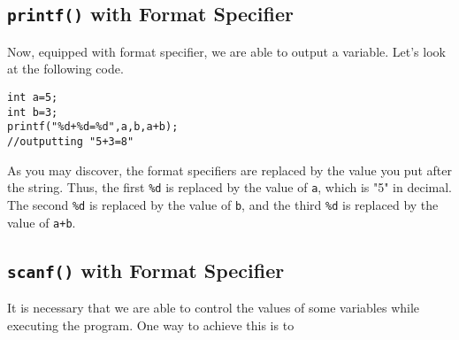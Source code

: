 \documentclass{report}
\begin{document}
    \subsection{\texttt{printf()} with Format Specifier}
    Now, equipped with format specifier, we are able to output a variable. Let's look at the following code.
\begin{lstlisting}[style=CStyle]
int a=5;
int b=3;
printf("%d+%d=%d",a,b,a+b);
//outputting "5+3=8" 
\end{lstlisting} 
    As you may discover, the format specifiers are replaced by the value you put after the string. Thus, the first \texttt{\%d} is replaced by the value of \texttt{a}, which is "5" in decimal. The second \texttt{\%d} is replaced by the value of \texttt{b}, and the third \texttt{\%d} is replaced by the value of \texttt{a+b}.
    \subsection{\texttt{scanf()} with Format Specifier}
    It is necessary that we are able to control the values of some variables while executing the program. One way to achieve this is to 
\end{document}
